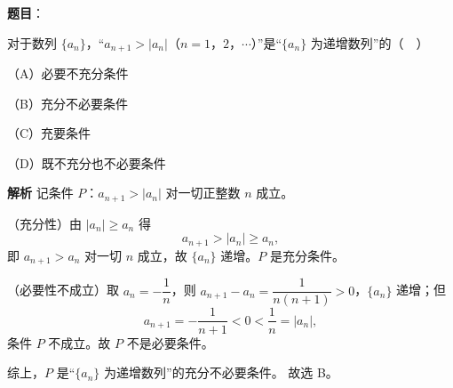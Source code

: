 \begin{answer}

\textbf{题目}：

对于数列 $\{a_n\}$，“$a_{n+1}>|a_n|$（$n=1$，$2$，$\cdots$）”是“$\{a_n\}$ 为递增数列”的（　）

（A）必要不充分条件

（B）充分不必要条件

（C）充要条件

（D）既不充分也不必要条件

\textbf{解析}
记条件 $P$：$a_{n+1}>|a_n|$ 对一切正整数 $n$ 成立。

（充分性）由 $|a_n|\geqslant a_n$ 得
\nopagebreak[4]
\[a_{n+1}>|a_n|\geqslant a_n,\]
即 $a_{n+1}>a_n$ 对一切 $n$ 成立，故 $\{a_n\}$ 递增。$P$ 是充分条件。

（必要性不成立）取 $a_n=-\dfrac1n$，则 $a_{n+1}-a_n=\dfrac{1}{n(n+1)}>0$，$\{a_n\}$ 递增；但
\nopagebreak[4]
\[a_{n+1}=-\frac1{n+1}<0<\frac1n=|a_n|,\]
条件 $P$ 不成立。故 $P$ 不是必要条件。

综上，$P$ 是“$\{a_n\}$ 为递增数列”的充分不必要条件。
故选 B。


\end{answer}
